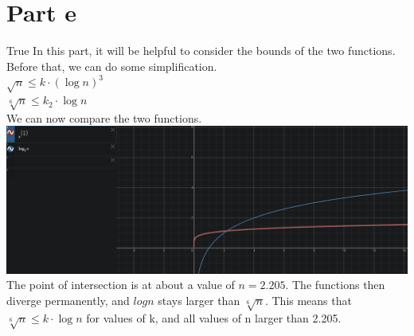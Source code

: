 \documentclass[]{article}
\begin{document}
\newpage

\section{Part e}
True
In this part, it will be helpful to consider the bounds of the two functions. Before that, we can do some simplification. \\
$ \sqrt{n} \leq k \cdot (\log n)^3 $ \\ 
$ \sqrt[6]{n} \leq k_2 \cdot \log n $ \\
We can now compare the two functions. \\
\includegraphics[scale=0.4]{Screenshot_1.png}
\\ The point of intersection is at about a value of $n=2.205$. The functions then diverge permanently, and $log n$ stays larger than $\sqrt[6]{n}$. This means that $\sqrt[6]{n} \leq k \cdot \log n$ for values of k, and all values of n larger than 2.205. 
\end{document}
